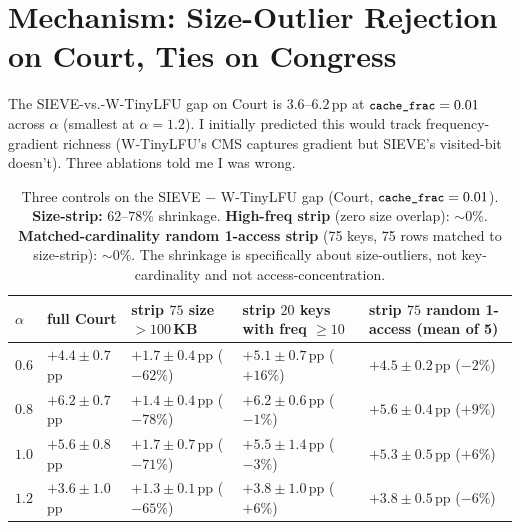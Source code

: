 \documentclass[letterpaper,twocolumn,10pt]{article}
\newcommand{\code}[1]{\texttt{\small #1}}
\begin{document}
\section{Mechanism: Size-Outlier Rejection on Court, Ties on Congress}\label{sec:mechanism}
The SIEVE-vs.-W-TinyLFU gap on Court is $3.6$--$6.2$\,pp at
$\code{cache\_frac} = 0.01$ across $\alpha$ (smallest at $\alpha=1.2$). I initially predicted
this would track frequency-gradient richness (W-TinyLFU's CMS captures
gradient but SIEVE's visited-bit doesn't). Three ablations told me I was wrong.
\begin{table}[t]
\centering
\footnotesize
\renewcommand{\arraystretch}{0.95}
\begin{tabularx}{\textwidth}{@{}lXXXX@{}}
\toprule
$\alpha$ & full Court & strip $75$ size $> 100$\,KB & strip $20$ keys with freq $\geq 10$ & strip $75$ random 1-access (mean of 5) \\
\midrule
$0.6$ & $+4.4 \pm 0.7$\,pp & $+1.7 \pm 0.4$\,pp ($-62\%$) & $+5.1 \pm 0.7$\,pp ($+16\%$) & $+4.5 \pm 0.2$\,pp ($-2\%$) \\
$0.8$ & $+6.2 \pm 0.7$\,pp & $+1.4 \pm 0.4$\,pp ($-78\%$) & $+6.2 \pm 0.6$\,pp ($-1\%$) & $+5.6 \pm 0.4$\,pp ($+9\%$) \\
$1.0$ & $+5.6 \pm 0.8$\,pp & $+1.7 \pm 0.7$\,pp ($-71\%$) & $+5.5 \pm 1.4$\,pp ($-3\%$) & $+5.3 \pm 0.5$\,pp ($+6\%$) \\
$1.2$ & $+3.6 \pm 1.0$\,pp & $+1.3 \pm 0.1$\,pp ($-65\%$) & $+3.8 \pm 1.0$\,pp ($+6\%$) & $+3.8 \pm 0.5$\,pp ($-6\%$) \\
\bottomrule
\end{tabularx}
\caption{Three controls on the SIEVE $-$ W-TinyLFU gap (Court,
$\code{cache\_frac} = 0.01$). \textbf{Size-strip:} $62$--$78\%$
shrinkage. \textbf{High-freq strip} (zero size overlap): $\sim 0\%$.
\textbf{Matched-cardinality random 1-access strip} (75 keys, 75 rows
matched to size-strip): $\sim 0\%$. The shrinkage is specifically
about size-outliers, not key-cardinality and not access-concentration.}
\label{tab:mechanism-decomp}
\end{table}
\end{document}
